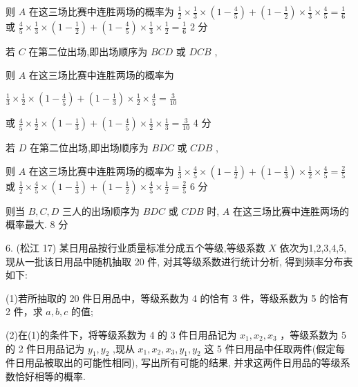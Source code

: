 \documentclass[10pt]{article}
\begin{document}
则 \(A\) 在这三场比赛中连胜两场的概率为 \(\frac{1}{2} \times  \frac{1}{3} \times  \left( {1 - \frac{4}{5}}\right)  + \left( {1 - \frac{1}{2}}\right)  \times  \frac{1}{3} \times  \frac{4}{5} = \frac{1}{6}\) 或 \(\frac{4}{5} \times  \frac{1}{3} \times  \left( {1 - \frac{1}{2}}\right)  + \left( {1 - \frac{4}{5}}\right)  \times  \frac{1}{3} \times  \frac{1}{2} = \frac{1}{6}\) 2 分

若 \(C\) 在第二位出场,即出场顺序为 \({BCD}\) 或 \({DCB}\) ,

则 \(A\) 在这三场比赛中连胜两场的概率为

\(\frac{1}{3} \times  \frac{1}{2} \times  \left( {1 - \frac{4}{5}}\right)  + \left( {1 - \frac{1}{3}}\right)  \times  \frac{1}{2} \times  \frac{4}{5} = \frac{3}{10}\)

或 \(\frac{4}{5} \times  \frac{1}{2} \times  \left( {1 - \frac{1}{3}}\right)  + \left( {1 - \frac{4}{5}}\right)  \times  \frac{1}{2} \times  \frac{1}{3} = \frac{3}{10}\) 4 分

若 \(D\) 在第二位出场,即出场顺序为 \({BDC}\) 或 \({CDB}\) ,

则 \(A\) 在这三场比赛中连胜两场的概率为 \(\frac{1}{3} \times  \frac{4}{5} \times  \left( {1 - \frac{1}{2}}\right)  + \left( {1 - \frac{1}{3}}\right)  \times  \frac{1}{2} \times  \frac{4}{5} = \frac{2}{5}\) 或 \(\frac{1}{2} \times  \frac{4}{5} \times  \left( {1 - \frac{1}{3}}\right)  + \left( {1 - \frac{1}{2}}\right)  \times  \frac{4}{5} \times  \frac{1}{2} = \frac{2}{5}\) 6 分

则当 \(B,C,D\) 三人的出场顺序为 \({BDC}\) 或 \({CDB}\) 时, \(A\) 在这三场比赛中连胜两场的概率最大. 8 分

6. (松江 17) 某日用品按行业质量标准分成五个等级,等级系数 \(X\) 依次为1,2,3,4,5, 现从一批该日用品中随机抽取 20 件, 对其等级系数进行统计分析, 得到频率分布表如下:

\begin{center}
\end{center}

(1)若所抽取的 20 件日用品中，等级系数为 4 的恰有 3 件，等级系数为 5 的恰有 2 件，求 \(a,b,c\) 的值;

(2)在(1)的条件下，将等级系数为 4 的 3 件日用品记为 \({x}_{1},{x}_{2},{x}_{3}\) ，等级系数为 5 的 2 件日用品记为 \({y}_{1},{y}_{2}\) ,现从 \({x}_{1},{x}_{2},{x}_{3},{y}_{1},{y}_{2}\) 这 5 件日用品中任取两件(假定每件日用品被取出的可能性相同), 写出所有可能的结果, 并求这两件日用品的等级系数恰好相等的概率.
\end{document}
